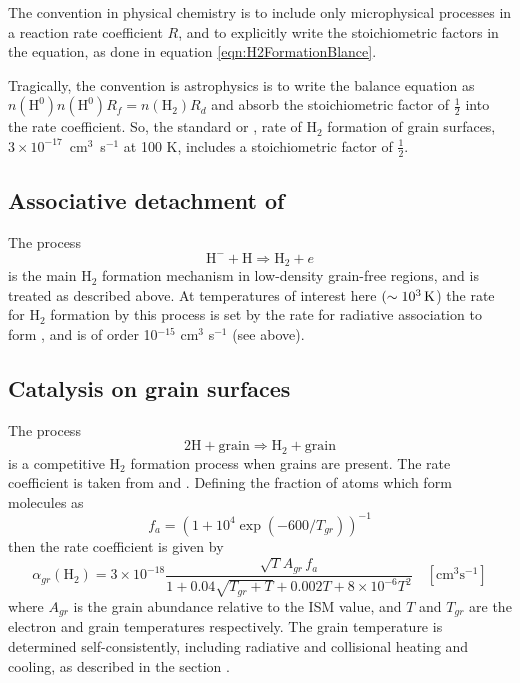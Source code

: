 The convention in physical chemistry is to include only microphysical
processes in a reaction rate coefficient $R$, and to explicitly write the
stoichiometric factors in the equation, as done in equation \ref{eqn:H2FormationBlance}.

Tragically, the convention is astrophysics is to write the balance
equation as $n\left( {{{\mathrm{H}}^0}} \right)n\left( {{{\mathrm{H}}^0}}
\right){R_f} = n\left( {{{\mathrm{H}}_2}} \right){R_d}$
and absorb the stoichiometric factor of $\frac{1}{2}$ into the rate
coefficient.  So, the standard or \citet{Jura1974}, \citet{Jura1975} rate of H$_2$ formation
of grain surfaces, $3\times 10^{-17}$~cm$^3$~s$^{-1}$ at 100 K, includes a stoichiometric factor
of $\frac{1}{2}$.

\subsection{Associative detachment of \hminus}

The process
\begin{equation}
{{\mathrm{H}}^ - } + {\mathrm{H}} \Rightarrow {{\mathrm{H}}_2} + e
\end{equation}
is the main H$_2$ formation mechanism in low-density grain-free regions, and
is treated as described above.
At temperatures of interest here $(\sim 10^3 {\rm\thinspace K}$)
the rate for H$_2$ formation by this process is set by the rate for radiative
association to form \hminus, and is of order 10$^{-15}$ cm$^3$ s$^{-1}$ (see above).

\subsection{Catalysis on grain surfaces}

The process
\begin{equation}
2{\mathrm{H}} + {\mathrm{grain}} \Rightarrow {{\mathrm{H}}_2} + {\mathrm{grain}}
\end{equation}
is a competitive H$_2$ formation process when grains are present.  The rate
coefficient is taken from \citet{Hollenbach1979} and \citet{Cazaux2002}.  Defining the fraction of atoms which form molecules as
\begin{equation}
{f_a} = {\left( {1 + {{10}^4}\exp \left( { - 600/{T_{gr}}} \right)}
\right)^{ - 1}}
\end{equation}
then the rate coefficient is given by
\begin{equation}
{\alpha _{gr}}\left( {{{\mathrm{H}}_2}} \right) = 3 \times {10^{ -
18}}\frac{{\sqrt T {A_{gr}}\,{f_a}}}{{1 + 0.04\sqrt {{T_{gr}} + T}  + 0.002T
+ 8 \times {{10}^{ - 6}}T_{}^2}}\quad
[\mathrm{cm}^3 \mathrm{s}^{-1}]
\end{equation}
where $A_{gr}$ is the grain abundance relative to the ISM value, and $T$
and $T_{gr}$
are the electron and grain temperatures respectively.  The grain temperature
is determined self-consistently, including radiative and collisional heating
and cooling, as described in the section .

